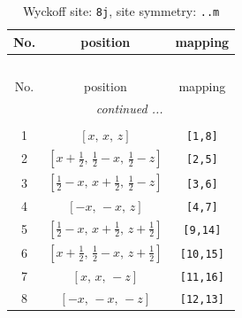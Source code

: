 \documentclass[fleqn,8pt]{jsarticle}
\begin{document}
\begin{longtable}{ccc}
\caption{Wyckoff site: {\tt 8j}, site symmetry: {\tt ..m}}
 \\
 \hline \hline
No. & position & mapping \\ \hline \endfirsthead

\multicolumn{2}{l}{\tablename\ \thetable{}} \\
 \hline \hline
No. & position & mapping \\ \hline \endhead

 \hline \hline
\multicolumn{2}{r}{\footnotesize\it continued ...} \\ \endfoot

 \hline \hline
\multicolumn{2}{r}{} \\ \endlastfoot

1 & $\left[ x,\, x,\, z \right]$ & {\tt [1,8]} \\ \hline
2 & $\left[ x + \frac{1}{2},\, \frac{1}{2} - x,\, \frac{1}{2} - z \right]$ & {\tt [2,5]} \\ \hline
3 & $\left[ \frac{1}{2} - x,\, x + \frac{1}{2},\, \frac{1}{2} - z \right]$ & {\tt [3,6]} \\ \hline
4 & $\left[ - x,\, - x,\, z \right]$ & {\tt [4,7]} \\ \hline
5 & $\left[ \frac{1}{2} - x,\, x + \frac{1}{2},\, z + \frac{1}{2} \right]$ & {\tt [9,14]} \\ \hline
6 & $\left[ x + \frac{1}{2},\, \frac{1}{2} - x,\, z + \frac{1}{2} \right]$ & {\tt [10,15]} \\ \hline
7 & $\left[ x,\, x,\, - z \right]$ & {\tt [11,16]} \\ \hline
8 & $\left[ - x,\, - x,\, - z \right]$ & {\tt [12,13]} \\
\end{longtable}
\renewcommand{\arraystretch}{1.2}
\end{document}
